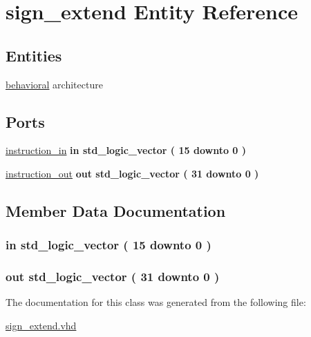 \hypertarget{classsign__extend}{\section{sign\-\_\-extend \-Entity \-Reference}
\label{classsign__extend}
}
\subsection*{\-Entities}
\begin{DoxyCompactItemize}
\item 
\hyperlink{classsign__extend_1_1behavioral}{behavioral} architecture
\end{DoxyCompactItemize}
\*
\*
\subsection*{\-Ports}
 \begin{DoxyCompactItemize}
\item 
\hyperlink{classsign__extend_aa9a13c51cd81134d998a1f8fbee3010f}{instruction\-\_\-in}  {\bfseries {\bfseries in }} {\bfseries std\-\_\-logic\-\_\-vector (   15    downto    0  ) } 
\item 
\hyperlink{classsign__extend_aadbe50a01a876c8353e55df1b83bc3c3}{instruction\-\_\-out}  {\bfseries {\bfseries out }} {\bfseries std\-\_\-logic\-\_\-vector (   31    downto    0  ) } 
\end{DoxyCompactItemize}


\subsection{\-Member \-Data \-Documentation}
\hypertarget{classsign__extend_aa9a13c51cd81134d998a1f8fbee3010f}{
\subsubsection[{instruction\-\_\-in}]{ {\bfseries in } {\bfseries std\-\_\-logic\-\_\-vector (   15    downto    0  ) } }}\label{classsign__extend_aa9a13c51cd81134d998a1f8fbee3010f}
\hypertarget{classsign__extend_aadbe50a01a876c8353e55df1b83bc3c3}{
\subsubsection[{instruction\-\_\-out}]{ {\bfseries out } {\bfseries std\-\_\-logic\-\_\-vector (   31    downto    0  ) } }}\label{classsign__extend_aadbe50a01a876c8353e55df1b83bc3c3}


\-The documentation for this class was generated from the following file\-:\begin{DoxyCompactItemize}
\item 
\hyperlink{sign__extend_8vhd}{sign\-\_\-extend.\-vhd}\end{DoxyCompactItemize}
